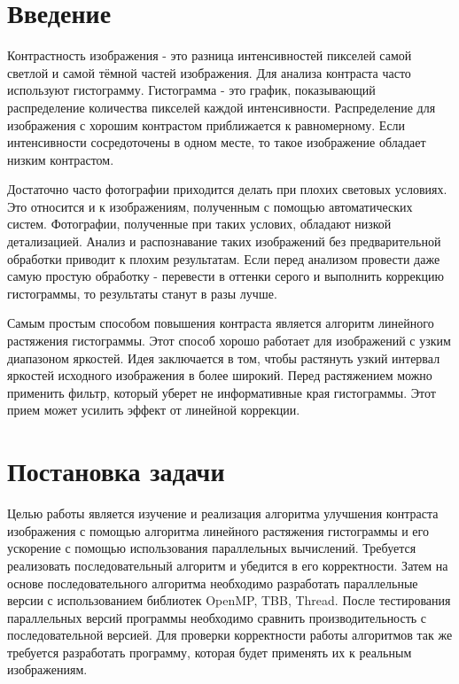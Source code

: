 \documentclass{report}
\begin{document}
	\tableofcontents

	\newpage
	

	\section*{Введение}
	\par Контрастность изображения - это разница интенсивностей пикселей самой светлой и самой тёмной частей изображения. Для анализа контраста часто используют гистограмму. Гистограмма - это график, показывающий распределение количества пикселей каждой интенсивности. Распределение для изображения с хорошим контрастом приближается к равномерному. Если интенсивности сосредоточены в одном месте, то такое изображение обладает низким контрастом.
	\par Достаточно часто фотографии приходится делать при плохих световых условиях. Это относится и к изображениям, полученным с помощью автоматических систем. Фотографии, полученные при таких услових, обладают низкой детализацией. Анализ и распознавание таких изображений без предварительной обработки приводит к плохим результатам. Если перед анализом провести даже самую простую обработку - перевести в оттенки серого и выполнить коррекцию гистограммы, то результаты станут в разы лучше.
	\par Самым простым способом повышения контраста является алгоритм линейного растяжения гистограммы. Этот способ хорошо работает для изображений с узким диапазоном яркостей. Идея заключается в том, чтобы растянуть узкий интервал яркостей исходного изображения в более широкий. Перед растяжением можно применить фильтр, который уберет не информативные края гистограммы. Этот прием может усилить эффект от линейной коррекции.

	\newpage
    \section*{Постановка задачи}
    \par Целью работы является изучение и реализация алгоритма улучшения контраста изображения с помощью алгоритма линейного растяжения гистограммы и его ускорение с помощью использования параллельных вычислений. Требуется реализовать последовательный алгоритм и убедится в его корректности. Затем на основе последовательного алгоритма необходимо разработать параллельные версии с использованием библиотек OpenMP, TBB, Thread. После тестирования параллельных версий программы необходимо сравнить производительность с последовательной версией. Для проверки корректности работы алгоритмов так же требуется разработать программу, которая будет применять их к реальным изображениям.
\end{document}
